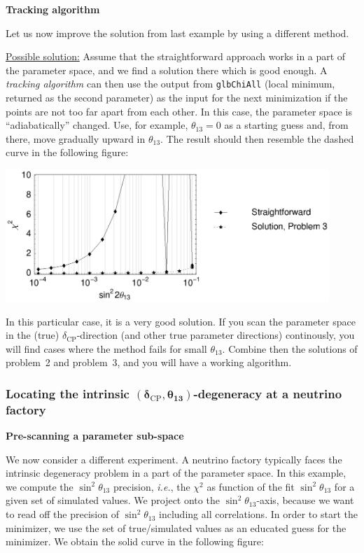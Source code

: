 \documentclass[12pt,a4paper]{article}
\newcommand{\aufg}[1]{\vspace{4mm}{\bf\underline{Problem #1:}}\vspace{3mm}}
\begin{document}
\aufg{3} {\bf Tracking algorithm}

Let us now improve the solution from last example by using a different method.

\vspace*{3mm}

\underline{Possible solution:} Assume that the straightforward approach works in a part of the parameter space, and we find a solution there which is good enough. A {\em tracking algorithm} can then use the output from {\tt glbChiAll} (local minimum, returned as the second parameter) as the input for the next minimization if the points are not too far apart from each other. In this case, the parameter space is ``adiabatically'' changed. Use, for example, $\theta_{13}=0$ as a starting guess and, from there, move gradually upward in $\theta_{13}$. 
The result should then resemble the dashed curve in the following figure:
\begin{center}
\includegraphics[height=5cm]{problem3}
\end{center}
In this particular case, it is a very good solution. If you scan the parameter space in the (true) $\delta_\mathrm{CP}$-direction (and other true parameter directions)
continously, you will find cases where the method fails for small $\theta_{13}$. Combine then the solutions
of problem~2 and problem~3, and you will have a working algorithm.

\subsubsection*{Locating the intrinsic $\boldsymbol{(\delta_\mathrm{CP},\theta_{13})}$-degeneracy at a neutrino factory} 

\aufg{4} {\bf Pre-scanning a parameter sub-space}

We now consider a different experiment. A neutrino factory typically faces the intrinsic degeneracy
problem in a part of the parameter space. In this example, we compute the $\sin^2 \theta_{13}$ precision, {\it i.e.}, the $\chi^2$ as function of the fit $\sin^2 \theta_{13}$ for a given set of simulated values. We project onto the $\sin^2 \theta_{13}$-axis, because we want to read off the precision of $\sin^2 \theta_{13}$ including all correlations. In order to start the minimizer, we use the set of true/simulated values as an educated guess for the minimizer. We obtain the solid curve in the following figure:
\end{document}
